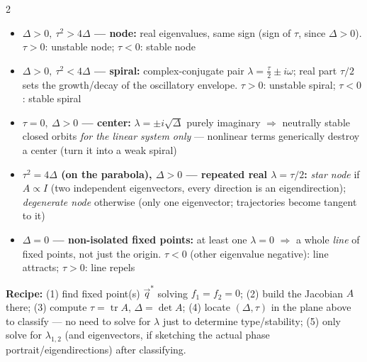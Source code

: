 \documentclass[10pt]{article}
\begin{document}
\begin{multicols}{2}
\begin{itemize}[nosep, leftmargin=1.1em]
    \item \textbf{$\Delta>0,\ \tau^2>4\Delta$ --- node:} real eigenvalues, same sign (sign of $\tau$, since $\Delta>0$). $\tau>0$: unstable node; $\tau<0$: stable node
    \item \textbf{$\Delta>0,\ \tau^2<4\Delta$ --- spiral:} complex-conjugate pair $\lambda=\tfrac{\tau}{2}\pm i\omega$; real part $\tau/2$ sets the growth/decay of the oscillatory envelope. $\tau>0$: unstable spiral; $\tau<0$: stable spiral
    \item \textbf{$\tau=0,\ \Delta>0$ --- center:} $\lambda=\pm i\sqrt\Delta$ purely imaginary $\Rightarrow$ neutrally stable closed orbits \emph{for the linear system only} --- nonlinear terms generically destroy a center (turn it into a weak spiral)
    \item \textbf{$\tau^2=4\Delta$ (on the parabola), $\Delta>0$ --- repeated real $\lambda=\tau/2$:} \emph{star node} if $A\propto I$ (two independent eigenvectors, every direction is an eigendirection); \emph{degenerate node} otherwise (only one eigenvector; trajectories become tangent to it)
    \item \textbf{$\Delta=0$ --- non-isolated fixed points:} at least one $\lambda=0$ $\Rightarrow$ a whole \emph{line} of fixed points, not just the origin. $\tau<0$ (other eigenvalue negative): line attracts; $\tau>0$: line repels
\end{itemize}

\textbf{Recipe:} (1) find fixed point(s) $\vec q^*$ solving $f_1=f_2=0$; (2) build the Jacobian $A$ there; (3) compute $\tau=\operatorname{tr}A$, $\Delta=\det A$; (4) locate $(\Delta,\tau)$ in the plane above to classify --- no need to solve for $\lambda$ just to determine type/stability; (5) only solve for $\lambda_{1,2}$ (and eigenvectors, if sketching the actual phase portrait/eigendirections) after classifying.


\end{multicols}
\end{document}

